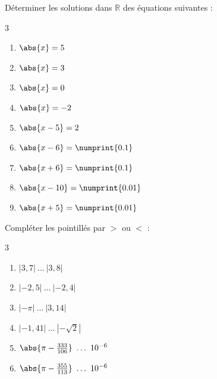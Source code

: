 \documentclass[main.tex]{subfiles}
\begin{document}
\begin{exercise}\label{chapter01:exercices:absolueequations} Déterminer les solutions dans $\mathbb{R}$ des équations suivantes :
	\begin{multicols}{3} 
		\begin{enumerate}[label={$\alph*)$}, leftmargin=*]
			\item $\abs{x}=5$
			\item $\abs{x}=3$
			\item $\abs{x}=0$
			\item $\abs{x}=-2$
			\item $\abs{x-5}=2$
			\item $\abs{x-6} =\numprint{0.1}$
			\item $\abs{x+6} =\numprint{0.1}$
			\item $\abs{x-10} =\numprint{0.01}$
			\item $\abs{x+5} =\numprint{0.01}$
		\end{enumerate}
	\end{multicols}  
\end{exercise}

\begin{exercise} 	Compléter les pointillés par $>$  ou $<$ :
	\begin{multicols}{3} 
		\begin{enumerate}[label={$\alph*)$}, leftmargin=*]
			\item $|3,7|~\dots~ |3,8|$
			\item $|-2,5|~\dots~ |-2,4|$
			\item $|-\pi|~\dots~ |3,14|$
			\item $|-1,41|~\dots~ |-\sqrt{2}|$
			\item $\abs{\pi-\tfrac{333}{106}}~\dots~10^{-6}$
			\item $\abs{\pi-\tfrac{355}{113}}~\dots~10^{-6}$ 
		\end{enumerate}
	\end{multicols}  
\end{exercise} 

%	 
\newpage 
\end{document}
